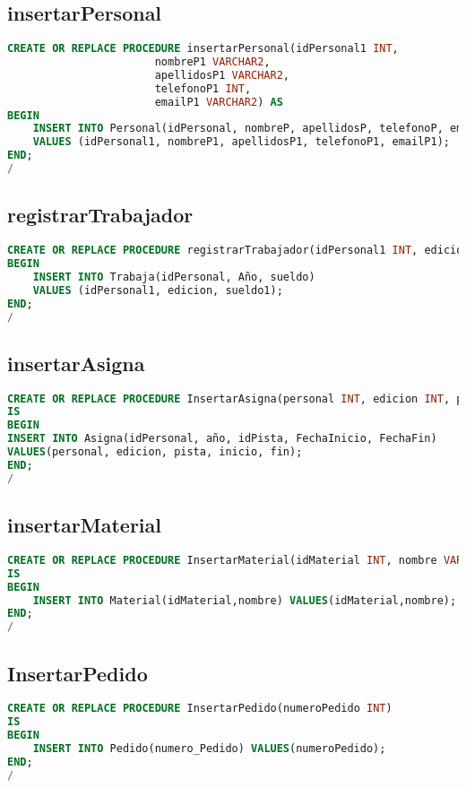 \subsection{insertarPersonal}
\begin{lstlisting}[language=sql]
CREATE OR REPLACE PROCEDURE insertarPersonal(idPersonal1 INT,
                       nombreP1 VARCHAR2,
                       apellidosP1 VARCHAR2,
                       telefonoP1 INT,
                       emailP1 VARCHAR2) AS
BEGIN
    INSERT INTO Personal(idPersonal, nombreP, apellidosP, telefonoP, emailP)
    VALUES (idPersonal1, nombreP1, apellidosP1, telefonoP1, emailP1);
END;
/
\end{lstlisting}

\subsection{registrarTrabajador}
\begin{lstlisting}[language=sql]
CREATE OR REPLACE PROCEDURE registrarTrabajador(idPersonal1 INT, edicion INT, sueldo1 NUMBER) AS
BEGIN
    INSERT INTO Trabaja(idPersonal, Año, sueldo)
    VALUES (idPersonal1, edicion, sueldo1);
END;
/
\end{lstlisting}

\subsection{insertarAsigna}
\begin{lstlisting}[language=sql]
CREATE OR REPLACE PROCEDURE InsertarAsigna(personal INT, edicion INT, pista INT, inicio TIMESTAMP, fin TIMESTAMP)
IS
BEGIN
INSERT INTO Asigna(idPersonal, año, idPista, FechaInicio, FechaFin)
VALUES(personal, edicion, pista, inicio, fin);
END;
/
\end{lstlisting}

\subsection{insertarMaterial}
\begin{lstlisting}[language=sql]
CREATE OR REPLACE PROCEDURE InsertarMaterial(idMaterial INT, nombre VARCHAR2)
IS
BEGIN
    INSERT INTO Material(idMaterial,nombre) VALUES(idMaterial,nombre);
END;
/
\end{lstlisting}

\subsection{InsertarPedido}
\begin{lstlisting}[language=sql]
CREATE OR REPLACE PROCEDURE InsertarPedido(numeroPedido INT)
IS
BEGIN
    INSERT INTO Pedido(numero_Pedido) VALUES(numeroPedido);
END;
/
\end{lstlisting}

